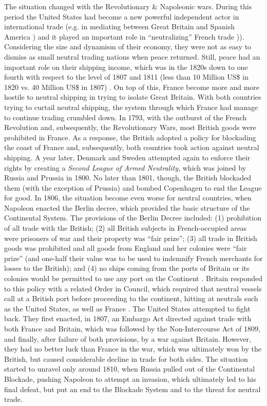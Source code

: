 \documentclass[12pt,a4paper,notitlepage,english]{article}
\begin{document}
The situation changed with the Revolutionary \& Napoleonic wars. During this period the United States had become a new powerful independent actor in international trade (e.g. in mediating between Great Britain and Spanish America \citep{Cuenca-Esteban2014}) and it played an important role in ``neutralizing'' French trade \citep{Marzagalli2005,Marzagalli2015})).
Considering the size and dynamism of their economy, they were not as easy to dismiss as small neutral trading nations when peace returned. Still, peace had an important role on their shipping income, which was in the 1820s down to one fourth with respect to the level of 1807 and 1811 (less than 10 Million US\$ in 1820 vs. 40 Million US\$ in 1807)  \citep[tables A-4 and B-2]{North1960}.
On top of this, France become more and more hostile to neutral shipping in trying to isolate Great Britain. With both countries trying to curtail neutral shipping, the system through which France had manage to continue trading crumbled down. 
In 1793, with the outburst of the French Revolution and, subsequently, the Revolutionary Wars, most British goods were prohibited in France.
As a response, the British adopted a policy for blockading the coast of France and, subsequently, both countries took action against neutral shipping.
A year later, Denmark and Sweden attempted again to enforce their rights by creating a \textit{Second League of Armed Neutrality}, which was joined by Russia and Prussia in 1800.
No later than 1801, though, the British blockaded them (with the exception of Prussia) and bombed Copenhagen to end the League for good.
In 1806, the situation become even worse for neutral countries, when Napoleon enacted the Berlin decree, which provided the basic structure of the Continental System.
The provisions of the Berlin Decree included: (1) prohibition of all trade with the British; (2) all British subjects in French-occupied areas were prisoners of war and their property was ``fair prize''; (3) all trade in British goods was prohibited and all goods from England and her colonies were ``fair prize'' (and one-half their value was to be used to indemnify French merchants for losses to the British); and (4) no ships coming from the ports of Britain or its colonies would be permitted to use any port on the Continent \citep{Davis2006}.
Britain responded to this policy with a related Order in Council, which required that neutral vessels call at a British port before proceeding to the continent, hitting at neutrals such as the United States, as well as France \citep{Davis2006}.
The United States attempted to fight back. They first enacted, in 1807, an Embargo Act directed against trade with both France and Britain, which was followed by the Non-Intercourse Act of 1809, and finally, after failure of both provisions, by a war against Britain.
However, they had no better luck than France in the war, which was ultimately won by the British, but caused considerable decline in trade for both sides.
The situation started to unravel only around 1810, when Russia pulled out of the Continental Blockade, pushing Napoleon to attempt an invasion, which ultimately led to his final defeat, but put an end to the Blockade System and to the threat for neutral trade.
\end{document}
